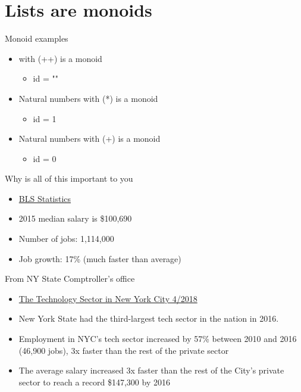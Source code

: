 \documentclass[presetation]{beamer}
\begin{document}
\section{Lists are monoids}
\label{sec:orgaf2add5}
\begin{frame}[label={sec:org9ec18ac}]{Monoid examples}
\begin{example}
\begin{itemize}
\item\relax [] with (++) is a monoid
\begin{itemize}
\item id = ""
\end{itemize}
\item Natural numbers with (*) is a monoid
\begin{itemize}
\item id = 1
\end{itemize}
\item Natural numbers with (+) is a monoid
\begin{itemize}
\item id = 0
\end{itemize}
\end{itemize}
\end{example}
\end{frame}


\begin{frame}[label={sec:org175b40c}]{Why is all of this important to you}
\begin{itemize}
\item \href{https://www.bls.gov/ooh/computer-and-information-technology/mobile/software-developers.htm}{BLS Statistics}
\item 2015 median salary is \$100,690
\item Number of jobs: 1,114,000
\item Job growth: 17\% (much faster than average)
\end{itemize}
\end{frame}

\begin{frame}[label={sec:org8c22703}]{From NY State Comptroller's office}
\begin{itemize}
\item \href{https://www.bls.gov/ooh/computer-and-information-technology/mobile/software-developers.htm}{The Technology Sector in New York City 4/2018}
\item New York State had the third-largest tech sector in the nation
in 2016.
\item Employment in NYC’s tech sector increased by 57\% between 2010 and
2016 (46,900 jobs), 3x faster than the rest of the private sector
\item The average salary increased 3x faster than the rest of the City’s
private sector to reach a record \$147,300 by 2016
\end{itemize}
\end{frame}
\end{document}
